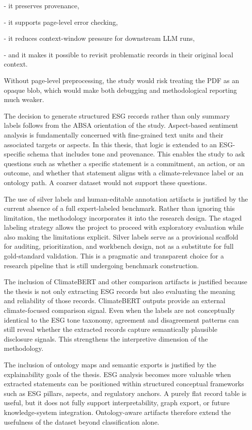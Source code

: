 \documentclass{article}
\begin{document}
- it preserves provenance,

- it supports page-level error checking,

- it reduces context-window pressure for downstream LLM runs,

- and it makes it possible to revisit problematic records in their original local context.

Without page-level preprocessing, the study would risk treating the PDF as an opaque blob, which would make both debugging and methodological reporting much weaker.

The decision to generate structured ESG records rather than only summary labels follows from the ABSA orientation of the study. Aspect-based sentiment analysis is fundamentally concerned with fine-grained text units and their associated targets or aspects. In this thesis, that logic is extended to an ESG-specific schema that includes tone and provenance. This enables the study to ask questions such as whether a specific statement is a commitment, an action, or an outcome, and whether that statement aligns with a climate-relevance label or an ontology path. A coarser dataset would not support these questions.

The use of silver labels and human-editable annotation artifacts is justified by the current absence of a full expert-labeled benchmark. Rather than ignoring this limitation, the methodology incorporates it into the research design. The staged labeling strategy allows the project to proceed with exploratory evaluation while also making the limitations explicit. Silver labels serve as a provisional scaffold for auditing, prioritization, and workbench design, not as a substitute for full gold-standard validation. This is a pragmatic and transparent choice for a research pipeline that is still undergoing benchmark construction.

The inclusion of ClimateBERT and other comparison artifacts is justified because the thesis is not only extracting ESG records but also evaluating the meaning and reliability of those records. ClimateBERT outputs provide an external climate-focused comparison signal. Even when the labels are not conceptually identical to the ESG tone taxonomy, agreement and disagreement patterns can still reveal whether the extracted records capture semantically plausible disclosure signals. This strengthens the interpretive dimension of the methodology.

The inclusion of ontology maps and semantic exports is justified by the explainability goals of the thesis. ESG analysis becomes more valuable when extracted statements can be positioned within structured conceptual frameworks such as ESG pillars, aspects, and regulatory anchors. A purely flat record table is useful, but it does not fully support interpretability, graph export, or future knowledge-system integration. Ontology-aware artifacts therefore extend the usefulness of the dataset beyond classification alone.
\end{document}
